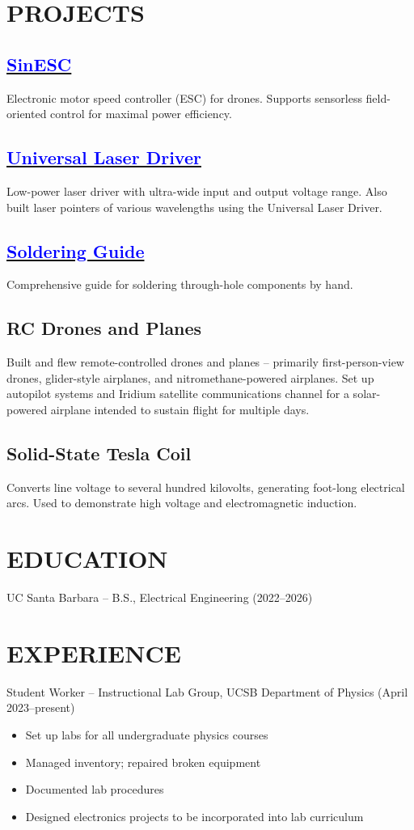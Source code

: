 	\section*{PROJECTS}
	\subsection{\href{https://github.com/SAR-mango/SinESC}{\textcolor{blue}{SinESC}}}
	Electronic motor speed controller (ESC) for drones. Supports sensorless field-oriented control for maximal power efficiency.
	\subsection{\href{https://github.com/SAR-mango/Universal-Laser-Driver}{\textcolor{blue}{Universal Laser Driver}}}
	Low-power laser driver with ultra-wide input and output voltage range. Also built laser pointers of various wavelengths using the Universal Laser Driver.
	\subsection{\href{https://github.com/SAR-mango/soldering-guide/blob/main/Soldering_Guide.pdf}{\textcolor{blue}{Soldering Guide}}}
	Comprehensive guide for soldering through-hole components by hand.
	\subsection{RC Drones and Planes}
	Built and flew remote-controlled drones and planes – primarily first-person-view drones, glider-style airplanes, and nitromethane-powered airplanes. Set up autopilot systems and Iridium satellite communications channel for a solar-powered airplane intended to sustain flight for multiple days.
	\subsection{Solid-State Tesla Coil}
	Converts line voltage to several hundred kilovolts, generating foot-long electrical arcs. Used to demonstrate high voltage and electromagnetic induction.
	
	\section*{EDUCATION}
	UC Santa Barbara – B.S., Electrical Engineering (2022–2026)
	
	\section*{EXPERIENCE}
	Student Worker – Instructional Lab Group, UCSB Department of Physics (April 2023–present)
	\begin{itemize}
		\setlength \itemsep{0.1em}
		\item Set up labs for all undergraduate physics courses
		\item Managed inventory; repaired broken equipment
		\item Documented lab procedures
		\item Designed electronics projects to be incorporated into lab curriculum
	\end{itemize}
